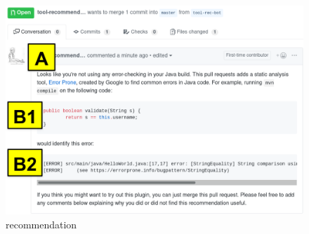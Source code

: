 \begin{figure}[h]
\centering
	\includegraphics[width=\textwidth]{Chapter-3/images/tool-recommender-bot.png}
	\caption{\TELE recommendation}
	\label{fig:sorry-rec} 
\end{figure}

